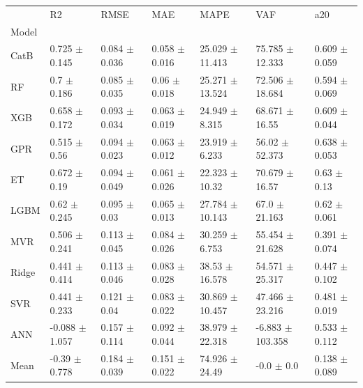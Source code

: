 \begin{tabular}{lllllll}
\toprule
 & R2 & RMSE & MAE & MAPE & VAF & a20 \\
Model &  &  &  &  &  &  \\
\midrule
CatB & 0.725 $\pm$ 0.145 & 0.084 $\pm$ 0.036 & 0.058 $\pm$ 0.016 & 25.029 $\pm$ 11.413 & 75.785 $\pm$ 12.333 & 0.609 $\pm$ 0.059 \\
RF & 0.7 $\pm$ 0.186 & 0.085 $\pm$ 0.035 & 0.06 $\pm$ 0.018 & 25.271 $\pm$ 13.524 & 72.506 $\pm$ 18.684 & 0.594 $\pm$ 0.069 \\
XGB & 0.658 $\pm$ 0.172 & 0.093 $\pm$ 0.034 & 0.063 $\pm$ 0.019 & 24.949 $\pm$ 8.315 & 68.671 $\pm$ 16.55 & 0.609 $\pm$ 0.044 \\
GPR & 0.515 $\pm$ 0.56 & 0.094 $\pm$ 0.023 & 0.063 $\pm$ 0.012 & 23.919 $\pm$ 6.233 & 56.02 $\pm$ 52.373 & 0.638 $\pm$ 0.053 \\
ET & 0.672 $\pm$ 0.19 & 0.094 $\pm$ 0.049 & 0.061 $\pm$ 0.026 & 22.323 $\pm$ 10.32 & 70.679 $\pm$ 16.57 & 0.63 $\pm$ 0.13 \\
LGBM & 0.62 $\pm$ 0.245 & 0.095 $\pm$ 0.03 & 0.065 $\pm$ 0.013 & 27.784 $\pm$ 10.143 & 67.0 $\pm$ 21.163 & 0.62 $\pm$ 0.061 \\
MVR & 0.506 $\pm$ 0.241 & 0.113 $\pm$ 0.045 & 0.084 $\pm$ 0.026 & 30.259 $\pm$ 6.753 & 55.454 $\pm$ 21.628 & 0.391 $\pm$ 0.074 \\
Ridge & 0.441 $\pm$ 0.414 & 0.113 $\pm$ 0.046 & 0.083 $\pm$ 0.028 & 38.53 $\pm$ 16.578 & 54.571 $\pm$ 25.317 & 0.447 $\pm$ 0.102 \\
SVR & 0.441 $\pm$ 0.233 & 0.121 $\pm$ 0.04 & 0.083 $\pm$ 0.022 & 30.869 $\pm$ 10.457 & 47.466 $\pm$ 23.216 & 0.481 $\pm$ 0.019 \\
ANN & -0.088 $\pm$ 1.057 & 0.157 $\pm$ 0.114 & 0.092 $\pm$ 0.044 & 38.979 $\pm$ 22.318 & -6.883 $\pm$ 103.358 & 0.533 $\pm$ 0.112 \\
Mean & -0.39 $\pm$ 0.778 & 0.184 $\pm$ 0.039 & 0.151 $\pm$ 0.022 & 74.926 $\pm$ 24.49 & -0.0 $\pm$ 0.0 & 0.138 $\pm$ 0.089 \\
\bottomrule
\end{tabular}
